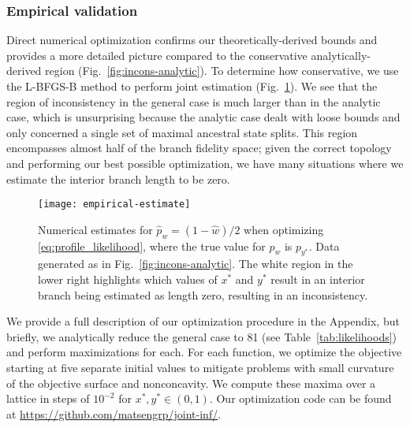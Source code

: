 \documentclass[11pt]{article}
\begin{document}
\subsubsection*{Empirical validation}

Direct numerical optimization confirms our theoretically-derived bounds and provides a more detailed picture compared to the conservative analytically\hyp{}derived region (Fig.~\ref{fig:incons-analytic}).
To determine how conservative, we use the L-BFGS-B method to perform joint estimation (Fig.~\ref{fig:bl-general-inconsistency}).
We see that the region of inconsistency in the general case is much larger than in the analytic case, which is unsurprising because the analytic case dealt with loose bounds and only concerned a single set of maximal ancestral state splits.
This region encompasses almost half of the branch fidelity space; given the correct topology and performing our best possible optimization, we have many situations where we estimate the interior branch length to be zero.

\begin{figure}
\centering
\texttt{[image: empirical-estimate]}
\caption{
    Numerical estimates for $\hat{p}_w=(1-\hat{w})/2$ when optimizing \eqref{eq:profile_likelihood}, where the true value for $p_w$ is $p_{y^*}$.
    Data generated as in Fig.~\ref{fig:incons-analytic}.
    The white region in the lower right highlights which values of $x^*$ and $y^*$ result in an interior branch being estimated as length zero, resulting in an inconsistency.
}
\label{fig:bl-general-inconsistency}
\end{figure}

We provide a full description of our optimization procedure in the Appendix, but briefly, we analytically reduce the general case to 81 (see Table~\ref{tab:likelihoods}) and perform maximizations for each.
For each function, we optimize the objective starting at five separate initial values to mitigate problems with small curvature of the objective surface and nonconcavity.
We compute these maxima over a lattice in steps of $10^{-2}$ for $x^*,y^*\in(0,1)$.
Our optimization code can be found at \url{https://github.com/matsengrp/joint-inf/}.
\end{document}
